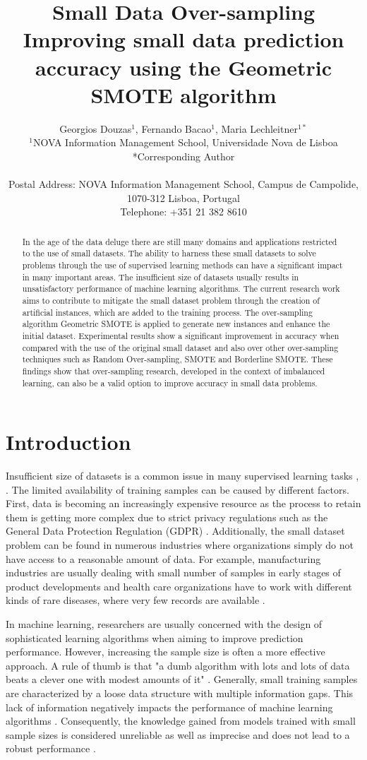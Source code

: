 \documentclass[parskip=full]{scrartcl}
\title{Small Data Over-sampling  \\ \LARGE{Improving small data prediction accuracy using the Geometric SMOTE algorithm}}
\author{
	Georgios Douzas\(^{1}\), Fernando Bacao\(^{1}\), Maria Lechleitner\(^{1*}\) 
	\\
	\small{\(^{1}\)NOVA Information Management School, Universidade Nova de Lisboa}
	\\
	\small{*Corresponding Author}
	\\
	\\
	\small{Postal Address: NOVA Information Management School, Campus de Campolide, 1070-312 Lisboa, Portugal}
	\\
	\small{Telephone: +351 21 382 8610}
}
\date{}
\begin{document}
\maketitle

\begin{abstract}
In the age of the data deluge there are still many domains and applications
restricted to the use of small datasets. The ability to harness these small
datasets to solve problems through the use of supervised learning methods can
have a significant impact in many important areas. The insufficient size of datasets usually results in unsatisfactory performance of machine learning
algorithms. The current research work aims to contribute to mitigate the small
dataset problem through the creation of artificial instances, which are added to
the training process. The over-sampling algorithm Geometric SMOTE is applied to
generate new instances and enhance the initial dataset. Experimental results
show a significant improvement in accuracy when compared with the use of the
original small dataset and also over other over-sampling techniques such as
Random Over-sampling, SMOTE and Borderline SMOTE. These findings show that
over-sampling research, developed in the context of imbalanced learning, can
also be a valid option to improve accuracy in small data problems.
\end{abstract}

\section{Introduction}
Insufficient size of datasets is a common issue in many supervised learning
tasks \cite{Niyogi.1998}, \cite{AbdulLateh.2017}. The limited availability of
training samples can be caused by different factors. First, data is becoming an
increasingly expensive resource \cite{Li.2007} as the process to retain them is
getting more complex due to strict privacy regulations such as the General Data
Protection Regulation (GDPR) \cite{EuropeanCommission.2019}. Additionally, the
small dataset problem can be found in numerous industries where organizations
simply do not have access to a reasonable amount of data. For example,
manufacturing industries are usually dealing with small number of samples in
early stages of product developments and health care organizations have to work
with different kinds of rare diseases, where very few records are available
\cite{AbdulLateh.2017}.

In machine learning, researchers are usually concerned with the design of
sophisticated learning algorithms when aiming to improve prediction performance.
However, increasing the sample size is often a more effective approach. A rule
of thumb is that "a dumb algorithm with lots and lots of data beats a clever one
with modest amounts of it" \cite{Domingos.2012}. Generally, small training
samples are characterized by a loose data structure with multiple information
gaps. This lack of information negatively impacts the performance of machine
learning algorithms \cite{Lin.2018}. Consequently, the knowledge gained from
models trained with small sample sizes is considered unreliable as well as
imprecise and does not lead to a robust performance \cite{AbdulLateh.2017}.
\end{document}
